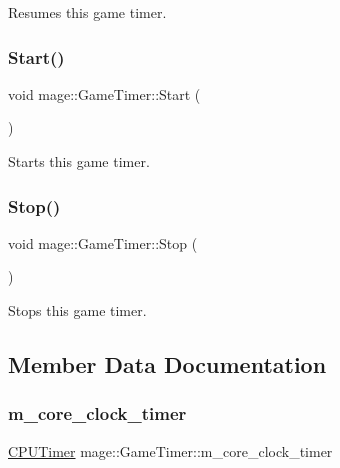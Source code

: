 Resumes this game timer. \hypertarget{classmage_1_1_game_timer_ab4eb362f71e15e1ca931d5bd0102db46}{}\label{classmage_1_1_game_timer_ab4eb362f71e15e1ca931d5bd0102db46} 
\subsubsection{\texorpdfstring{Start()}{Start()}}
{\footnotesize\ttfamily void mage\+::\+Game\+Timer\+::\+Start (\begin{DoxyParamCaption}{ }\end{DoxyParamCaption})\hspace{0.3cm}{\ttfamily [noexcept]}}

Starts this game timer. \hypertarget{classmage_1_1_game_timer_a309768cb7a9dee1f4ac358bdba1842f4}{}\label{classmage_1_1_game_timer_a309768cb7a9dee1f4ac358bdba1842f4} 
\subsubsection{\texorpdfstring{Stop()}{Stop()}}
{\footnotesize\ttfamily void mage\+::\+Game\+Timer\+::\+Stop (\begin{DoxyParamCaption}{ }\end{DoxyParamCaption})\hspace{0.3cm}{\ttfamily [noexcept]}}

Stops this game timer. 

\subsection{Member Data Documentation}
\hypertarget{classmage_1_1_game_timer_a7eb2652e13e4688115474a136a70c714}{}\label{classmage_1_1_game_timer_a7eb2652e13e4688115474a136a70c714} 
\subsubsection{\texorpdfstring{m\+\_\+core\+\_\+clock\+\_\+timer}{m\_core\_clock\_timer}}
{\footnotesize\ttfamily \hyperlink{namespacemage_a1032d81f22079b7190cac3bf14136068}{C\+P\+U\+Timer} mage\+::\+Game\+Timer\+::m\+\_\+core\+\_\+clock\+\_\+timer\hspace{0.3cm}{\ttfamily [private]}}

